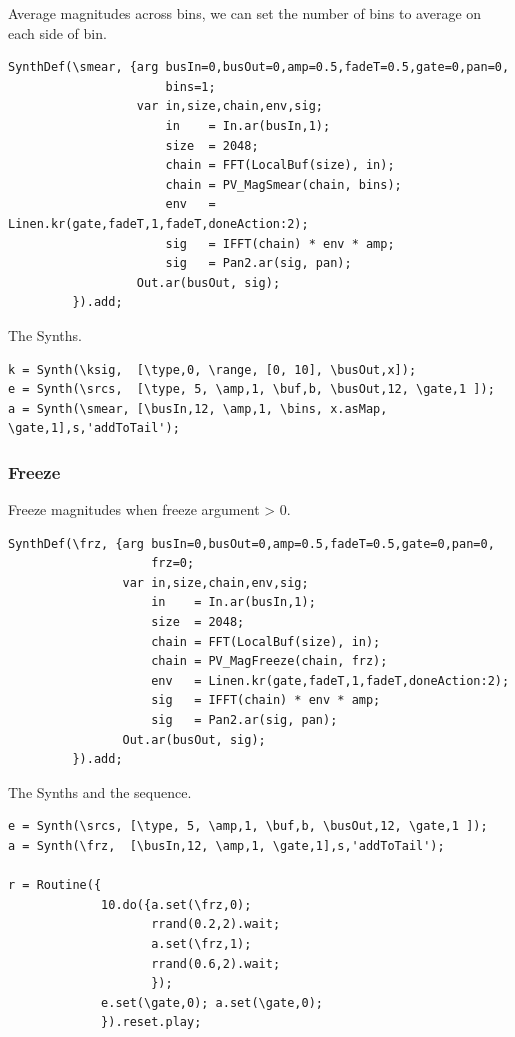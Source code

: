 Average magnitudes across bins, we can set the number of bins to average on each side of bin.

\begin{lstlisting}[frame=single,caption=Mag Smear spectral model] 
SynthDef(\smear, {arg busIn=0,busOut=0,amp=0.5,fadeT=0.5,gate=0,pan=0,
                      bins=1;
                  var in,size,chain,env,sig;
                      in    = In.ar(busIn,1);
                      size  = 2048;
                      chain = FFT(LocalBuf(size), in);
                      chain = PV_MagSmear(chain, bins);
                      env   = Linen.kr(gate,fadeT,1,fadeT,doneAction:2);
                      sig   = IFFT(chain) * env * amp;
                      sig   = Pan2.ar(sig, pan);
                  Out.ar(busOut, sig);
         }).add;
\end{lstlisting}

The Synths.

\begin{lstlisting}[frame=single] 
k = Synth(\ksig,  [\type,0, \range, [0, 10], \busOut,x]);
e = Synth(\srcs,  [\type, 5, \amp,1, \buf,b, \busOut,12, \gate,1 ]);
a = Synth(\smear, [\busIn,12, \amp,1, \bins, x.asMap, \gate,1],s,'addToTail');
\end{lstlisting}

\subsubsection{Freeze}\label{freeze}

Freeze magnitudes when freeze argument \textgreater{} 0.

\begin{lstlisting}[frame=single,caption=Freeze spectral model] 
SynthDef(\frz, {arg busIn=0,busOut=0,amp=0.5,fadeT=0.5,gate=0,pan=0,
                    frz=0;
                var in,size,chain,env,sig;
                    in    = In.ar(busIn,1);
                    size  = 2048;
                    chain = FFT(LocalBuf(size), in);
                    chain = PV_MagFreeze(chain, frz);
                    env   = Linen.kr(gate,fadeT,1,fadeT,doneAction:2);
                    sig   = IFFT(chain) * env * amp;
                    sig   = Pan2.ar(sig, pan);
                Out.ar(busOut, sig);
         }).add;
\end{lstlisting}

The Synths and the sequence.

\begin{lstlisting}[frame=single] 
e = Synth(\srcs, [\type, 5, \amp,1, \buf,b, \busOut,12, \gate,1 ]);
a = Synth(\frz,  [\busIn,12, \amp,1, \gate,1],s,'addToTail');
                    
r = Routine({
             10.do({a.set(\frz,0);
                    rrand(0.2,2).wait;
                    a.set(\frz,1);
                    rrand(0.6,2).wait;
                    });
             e.set(\gate,0); a.set(\gate,0);    
             }).reset.play;
\end{lstlisting}

